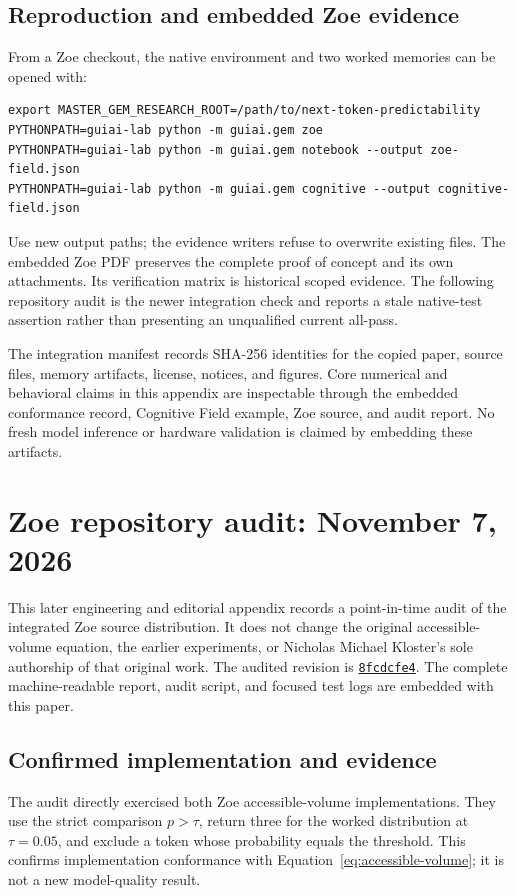 \documentclass[11pt,a4paper]{article}
\begin{document}
\subsection{Reproduction and embedded Zoe evidence}
From a Zoe checkout, the native environment and two worked memories can be opened with:
\begin{lstlisting}
export MASTER_GEM_RESEARCH_ROOT=/path/to/next-token-predictability
PYTHONPATH=guiai-lab python -m guiai.gem zoe
PYTHONPATH=guiai-lab python -m guiai.gem notebook --output zoe-field.json
PYTHONPATH=guiai-lab python -m guiai.gem cognitive --output cognitive-field.json
\end{lstlisting}
Use new output paths; the evidence writers refuse to overwrite existing files. The embedded Zoe PDF preserves the complete proof of concept and its own attachments. Its verification matrix is historical scoped evidence. The following repository audit is the newer integration check and reports a stale native-test assertion rather than presenting an unqualified current all-pass.

The integration manifest records SHA-256 identities for the copied paper, source files, memory artifacts, license, notices, and figures. Core numerical and behavioral claims in this appendix are inspectable through the embedded conformance record, Cognitive Field example, Zoe source, and audit report. No fresh model inference or hardware validation is claimed by embedding these artifacts.

\section{Zoe repository audit: November 7, 2026}
This later engineering and editorial appendix records a point-in-time audit of the integrated Zoe source distribution. It does not change the original accessible-volume equation, the earlier experiments, or Nicholas Michael Kloster's sole authorship of that original work. The audited revision is \href{https://github.com/Ablation-Tool/zoe/commit/8fcdcfe49959761f87c746e808c168a1100a9707}{\texttt{8fcdcfe4}}. The complete machine-readable report, audit script, and focused test logs are embedded with this paper.

\subsection{Confirmed implementation and evidence}
The audit directly exercised both Zoe accessible-volume implementations. They use the strict comparison $p>\tau$, return three for the worked distribution at $\tau=0.05$, and exclude a token whose probability equals the threshold. This confirms implementation conformance with Equation~\ref{eq:accessible-volume}; it is not a new model-quality result.
\end{document}
